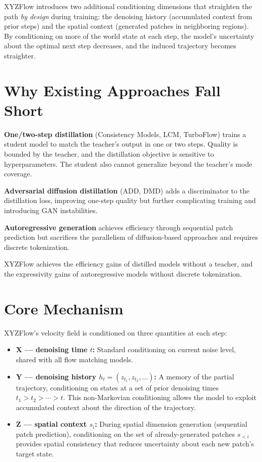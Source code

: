 \documentclass[10pt,twocolumn]{article}
\begin{document}
XYZFlow introduces two additional conditioning dimensions that straighten the
path \emph{by design} during training: the denoising history (accumulated context
from prior steps) and the spatial context (generated patches in neighboring regions).
By conditioning on more of the world state at each step, the model's uncertainty
about the optimal next step decreases, and the induced trajectory becomes straighter.

\section{Why Existing Approaches Fall Short}

\textbf{One/two-step distillation} (Consistency Models, LCM, TurboFlow) trains a
student model to match the teacher's output in one or two steps. Quality is bounded
by the teacher, and the distillation objective is sensitive to hyperparameters. The
student also cannot generalize beyond the teacher's mode coverage.

\textbf{Adversarial diffusion distillation} (ADD, DMD) adds a discriminator to
the distillation loss, improving one-step quality but further complicating training
and introducing GAN instabilities.

\textbf{Autoregressive generation} achieves efficiency through sequential patch
prediction but sacrifices the parallelism of diffusion-based approaches and requires
discrete tokenization.

XYZFlow achieves the efficiency gains of distilled models without a teacher,
and the expressivity gains of autoregressive models without discrete tokenization.

\section{Core Mechanism}

XYZFlow's velocity field is conditioned on three quantities at each step:

\begin{itemize}[itemsep=2pt,parsep=0pt]
  \item \textbf{X --- denoising time $t$:} Standard conditioning on current
    noise level, shared with all flow matching models.
  \item \textbf{Y --- denoising history $h_t = (z_{t_1}, z_{t_2}, \ldots)$:}
    A memory of the partial trajectory, conditioning on states at a set of
    prior denoising times $t_1 > t_2 > \cdots > t$. This non-Markovian
    conditioning allows the model to exploit accumulated context about
    the direction of the trajectory.
  \item \textbf{Z --- spatial context $s_i$:} During spatial dimension
    generation (sequential patch prediction), conditioning on the set
    of already-generated patches $s_{<i}$ provides spatial consistency
    that reduces uncertainty about each new patch's target state.
\end{itemize}
\end{document}
